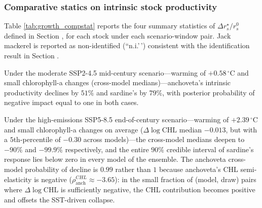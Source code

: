 \documentclass[
  11pt,
]{article}
\begin{document}
\subsubsection{Comparative statics on intrinsic stock productivity}\label{comparative-statics-on-intrinsic-stock-productivity}

Table \ref{tab:growth_compstat} reports the four summary statistics of \(\Delta r_s^{\star}/r_s^{0}\) defined in Section \emph{}, for each stock under each scenario-window pair. Jack mackerel is reported as non-identified (``n.i.'\,') consistent with the identification result in Section \emph{}.

Under the moderate SSP2-4.5 mid-century scenario---warming of \(+0.58\,^{\circ}\)C and small chlorophyll-a changes (cross-model medians)---anchoveta's intrinsic productivity declines by \(51\%\) and sardine's by \(79\%\), with posterior probability of negative impact equal to one in both cases.

Under the high-emissions SSP5-8.5 end-of-century scenario---warming of \(+2.39\,^{\circ}\)C and small chlorophyll-a changes on average (\(\Delta\log\text{CHL}\) median \(-0.013\), but with a \(5\)th-percentile of \(-0.30\) across models)---the cross-model medians deepen to \(-90\%\) and \(-99.9\%\) respectively, and the entire \(90\%\) credible interval of sardine's response lies below zero in every model of the ensemble. The anchoveta cross-model probability of decline is \(0.99\) rather than \(1\) because anchoveta's CHL semi-elasticity is negative (\(\rho^{CHL}_{\text{anch}} \approx -3.65\)): in the small fraction of (model, draw) pairs where \(\Delta\log\text{CHL}\) is sufficiently negative, the CHL contribution becomes positive and offsets the SST-driven collapse.
\end{document}
